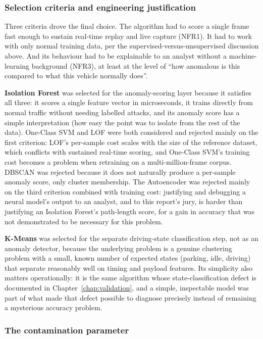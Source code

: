 \subsubsection{Selection criteria and engineering justification}

Three criteria drove the final choice. The algorithm had to score a single frame fast enough to sustain real-time replay and live capture (NFR1). It had to work with only normal training data, per the supervised-versus-unsupervised discussion above. And its behaviour had to be explainable to an analyst without a machine-learning background (NFR3), at least at the level of ``how anomalous is this compared to what this vehicle normally does''.

\textbf{Isolation Forest} was selected for the anomaly-scoring layer because it satisfies all three: it scores a single feature vector in microseconds, it trains directly from normal traffic without needing labelled attacks, and its anomaly score has a simple interpretation (how easy the point was to isolate from the rest of the data). One-Class SVM and LOF were both considered and rejected mainly on the first criterion: LOF's per-sample cost scales with the size of the reference dataset, which conflicts with sustained real-time scoring, and One-Class SVM's training cost becomes a problem when retraining on a multi-million-frame corpus. DBSCAN was rejected because it does not naturally produce a per-sample anomaly score, only cluster membership. The Autoencoder was rejected mainly on the third criterion combined with training cost: justifying and debugging a neural model's output to an analyst, and to this report's jury, is harder than justifying an Isolation Forest's path-length score, for a gain in accuracy that was not demonstrated to be necessary for this problem.

\textbf{K-Means} was selected for the separate driving-state classification step, not as an anomaly detector, because the underlying problem is a genuine clustering problem with a small, known number of expected states (parking, idle, driving) that separate reasonably well on timing and payload features. Its simplicity also matters operationally: it is the same algorithm whose state-classification defect is documented in Chapter~\ref{chap:validation}, and a simple, inspectable model was part of what made that defect possible to diagnose precisely instead of remaining a mysterious accuracy problem.

\subsubsection{The contamination parameter}

